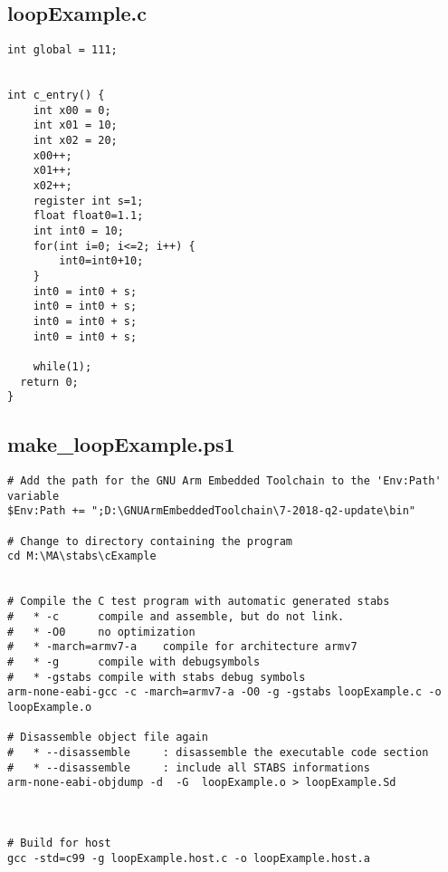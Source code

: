 \subsection{loopExample.c}
\label{anhang:loopExample.c}
\lstset{language=c}
\begin{lstlisting}
int global = 111;


int c_entry() {
	int x00 = 0;
	int x01 = 10;
	int x02 = 20;
	x00++;
	x01++;
	x02++;
	register int s=1;
	float float0=1.1;
	int int0 = 10;
	for(int i=0; i<=2; i++) {
		int0=int0+10;
	}
	int0 = int0 + s;
	int0 = int0 + s;
	int0 = int0 + s;
	int0 = int0 + s;
	
	while(1);
  return 0;
}
\end{lstlisting}


\subsection{make\_loopExample.ps1}
\label{anhang:make_loopExample.ps1}
\lstset{language=sh}
\begin{lstlisting}
# Add the path for the GNU Arm Embedded Toolchain to the 'Env:Path' variable
$Env:Path += ";D:\GNUArmEmbeddedToolchain\7-2018-q2-update\bin"

# Change to directory containing the program
cd M:\MA\stabs\cExample


# Compile the C test program with automatic generated stabs
#   * -c      compile and assemble, but do not link.
#   * -O0     no optimization
#   * -march=armv7-a    compile for architecture armv7 
#   * -g      compile with debugsymbols
#   * -gstabs compile with stabs debug symbols
arm-none-eabi-gcc -c -march=armv7-a -O0 -g -gstabs loopExample.c -o loopExample.o

# Disassemble object file again
#   * --disassemble     : disassemble the executable code section
#   * --disassemble     : include all STABS informations
arm-none-eabi-objdump -d  -G  loopExample.o > loopExample.Sd



# Build for host
gcc -std=c99 -g loopExample.host.c -o loopExample.host.a
\end{lstlisting}



